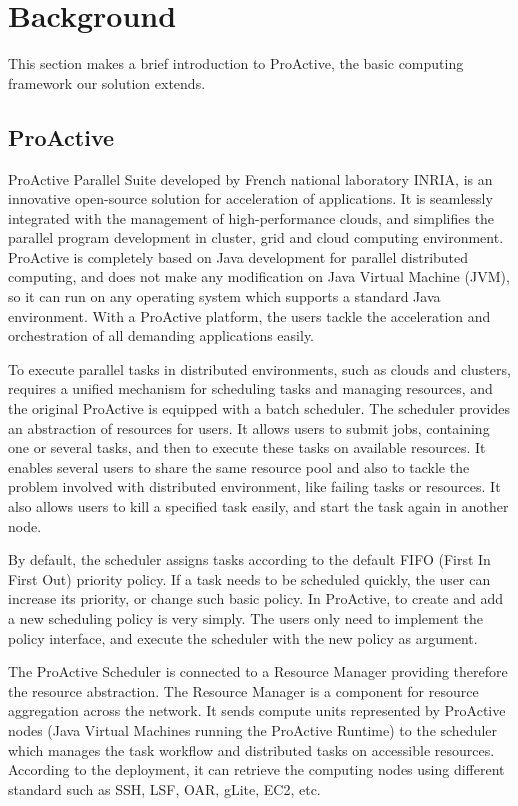 \section{Background}

This section makes a brief introduction to ProActive, the basic computing framework our solution extends.

\subsection{ProActive}

ProActive Parallel Suite developed by French national laboratory INRIA, is an innovative open-source solution for acceleration of applications. It is seamlessly integrated with the management of high-performance clouds, and simplifies the parallel program development in cluster, grid and cloud computing environment. ProActive is completely based on Java development for parallel distributed computing, and does not make any modification on Java Virtual Machine (JVM), so it can run on any operating system which supports a standard Java environment. With a ProActive platform, the users tackle the acceleration and orchestration of all demanding applications easily. %

To execute parallel tasks in distributed environments, such as clouds and clusters, requires a unified mechanism for scheduling tasks and managing resources, and the original ProActive is equipped with a batch scheduler. %
The scheduler provides an abstraction of resources for users. It allows users to submit jobs, containing one or several tasks, and then to execute these tasks on available resources. It enables several users to share the same resource pool and also to tackle the problem involved with distributed environment, like failing tasks or resources. It also allows users to kill a specified task easily, and start the task again in another node.

By default, the scheduler assigns tasks according to the default FIFO (First In First Out) priority policy. If a task needs to be scheduled quickly, the user can increase its priority, or change such basic policy. In ProActive, to create and add a new scheduling policy is very simply. The users only need to implement the policy interface, and execute the scheduler with the new policy as argument.

The ProActive Scheduler is connected to a Resource Manager providing therefore the resource abstraction. %
The Resource Manager is a component for resource aggregation across the network. It sends compute units represented by ProActive nodes (Java Virtual Machines running the ProActive Runtime)   to the scheduler which manages the task workflow and distributed tasks on accessible resources. According to the deployment, it can retrieve the computing nodes using different standard such as SSH, LSF, OAR, gLite, EC2, etc.

